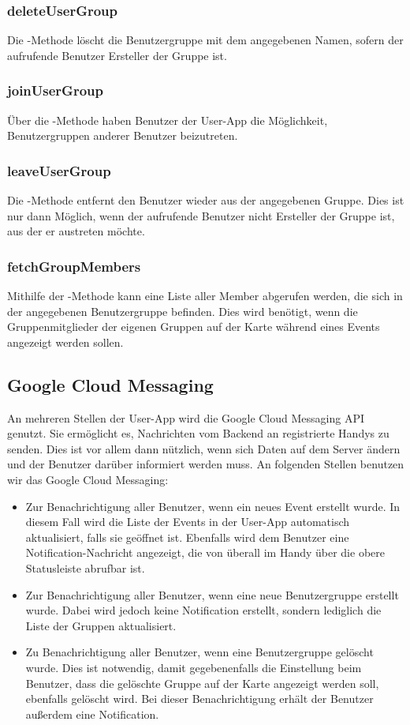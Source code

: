\subsubsection*{deleteUserGroup}
Die -Methode löscht die Benutzergruppe mit dem angegebenen Namen, sofern der aufrufende Benutzer Ersteller der Gruppe ist.

\subsubsection*{joinUserGroup}
Über die -Methode haben Benutzer der User-App die Möglichkeit, Benutzergruppen anderer Benutzer beizutreten.

\subsubsection*{leaveUserGroup}
Die -Methode entfernt den Benutzer wieder aus der angegebenen Gruppe. Dies ist nur dann Möglich, wenn der aufrufende Benutzer nicht Ersteller der Gruppe ist, aus der er austreten möchte.

\subsubsection*{fetchGroupMembers}
Mithilfe der -Methode kann eine Liste aller Member abgerufen werden, die sich in der angegebenen Benutzergruppe befinden. Dies wird benötigt, wenn die Gruppenmitglieder der eigenen Gruppen auf der Karte während eines Events angezeigt werden sollen.


\subsection{Google Cloud Messaging}
An mehreren Stellen der User-App wird die Google Cloud Messaging API genutzt. Sie ermöglicht es, Nachrichten vom Backend an registrierte Handys zu senden. Dies ist vor allem dann nützlich, wenn sich Daten auf dem Server ändern und der Benutzer darüber informiert werden muss. An folgenden Stellen benutzen wir das Google Cloud Messaging:

\begin{itemize}
\item Zur Benachrichtigung aller Benutzer, wenn ein neues Event erstellt wurde. In diesem Fall wird die Liste der Events in der User-App automatisch aktualisiert, falls sie geöffnet ist. Ebenfalls wird dem Benutzer eine Notification-Nachricht angezeigt, die von überall im Handy über die obere Statusleiste abrufbar ist.
\item Zur Benachrichtigung aller Benutzer, wenn eine neue Benutzergruppe erstellt wurde. Dabei wird jedoch keine Notification erstellt, sondern lediglich die Liste der Gruppen aktualisiert.
\item Zu Benachrichtigung aller Benutzer, wenn eine Benutzergruppe gelöscht wurde. Dies ist notwendig, damit gegebenenfalls die Einstellung beim Benutzer, dass die gelöschte Gruppe auf der Karte angezeigt werden soll, ebenfalls gelöscht wird. Bei dieser Benachrichtigung erhält der Benutzer außerdem eine Notification.
\end{itemize}

